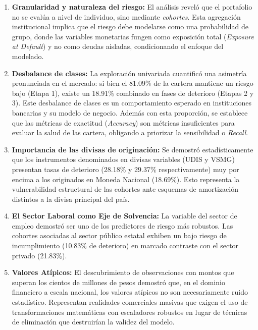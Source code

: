 \begin{enumerate}
	\item \textbf{Granularidad y naturaleza del riesgo:} El análisis reveló que el portafolio no se evalúa a nivel de individuo, sino mediante \textit{cohortes}. Esta agregación institucional implica que el riesgo debe modelarse como una probabilidad de grupo, donde las variables monetarias fungen como exposición total (\textit{Exposure at Default}) y no como deudas aisladas, condicionando el enfoque del modelado.
	
	\item \textbf{Desbalance de clases:} La exploración univariada cuantificó una asimetría pronunciada en el mercado: si bien el 81.09\% de la cartera mantiene un riesgo bajo (Etapa 1), existe un 18.91\% combinado en fases de deterioro (Etapas 2 y 3). Este desbalance de clases es un comportamiento esperado en instituciones bancarias y su modelo de negocio. Además con esta proporción, se establece que las métricas de exactitud (\textit{Accuracy}) son métricas insuficientes para evaluar la salud de las cartera, obligando a priorizar la sensibilidad o \textit{Recall}.
	
	\item \textbf{Importancia de las divisas de originación:} Se demostró estadísticamente que los instrumentos denominados en divisas variables (UDIS y VSMG) presentan tasas de deterioro (28.18\% y 29.37\% respectivamente) muy por encima a los originados en Moneda Nacional (18.69\%). Esto representa la vulnerabilidad estructural de las cohortes ante esquemas de amortización distintos a la divisa principal del país.
	
	\item \textbf{El Sector Laboral como Eje de Solvencia:} La variable del sector de empleo demostró ser uno de los predictores de riesgo más robustos. Las cohortes asociadas al sector público estatal exhiben un bajo riesgo de incumplimiento (10.83\% de deterioro) en marcado contraste con el sector privado (21.83\%).
	
	\item \textbf{Valores Atípicos:} El descubrimiento de observaciones con montos que superan los cientos de millones de pesos demostró que, en el dominio financiero a escala nacional, los valores atípicos no son necesariamente ruido estadístico. Representan realidades comerciales masivas que exigen el uso de transformaciones matemáticas con escaladores robustos en lugar de técnicas de eliminación que destruirían la validez del modelo.
	

\end{enumerate}
